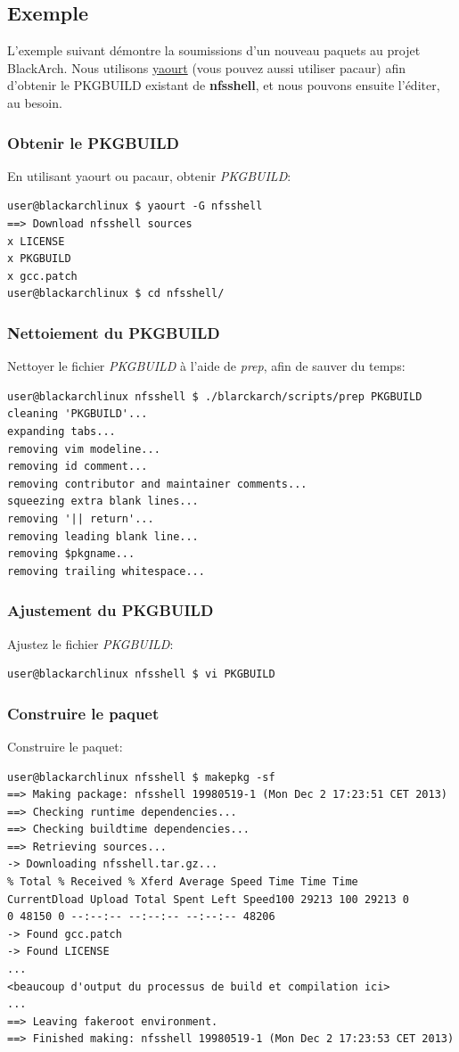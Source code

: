 \documentclass[a4paper, oneside, 11pt]{book}
\begin{document}
\subsection{Exemple}
L'exemple suivant démontre la soumissions d'un nouveau paquets au projet
BlackArch. Nous utilisons \href{https://wiki.archlinux.org/index.php/yaourt}{yaourt}
(vous pouvez aussi utiliser pacaur) afin d'obtenir le PKGBUILD existant de
\textbf{nfsshell}, et nous pouvons ensuite l'éditer, au besoin.

\subsubsection{Obtenir le PKGBUILD}
En utilisant yaourt ou pacaur, obtenir \textit{PKGBUILD}:
{\small
\color{gray}
\begin{verbatim}
user@blackarchlinux $ yaourt -G nfsshell
==> Download nfsshell sources
x LICENSE
x PKGBUILD
x gcc.patch
user@blackarchlinux $ cd nfsshell/
\end{verbatim}
}

\subsubsection{Nettoiement du PKGBUILD}
Nettoyer le fichier \textit{PKGBUILD} à l'aide de \textit{prep}, afin de sauver
du temps:
{\small
\color{gray}
\begin{verbatim}
user@blackarchlinux nfsshell $ ./blarckarch/scripts/prep PKGBUILD
cleaning 'PKGBUILD'...
expanding tabs...
removing vim modeline...
removing id comment...
removing contributor and maintainer comments...
squeezing extra blank lines...
removing '|| return'...
removing leading blank line...
removing $pkgname...
removing trailing whitespace...
\end{verbatim}
}

\subsubsection{Ajustement du PKGBUILD}
Ajustez le fichier \textit{PKGBUILD}:
{\small
\color{gray}
\begin{verbatim}
user@blackarchlinux nfsshell $ vi PKGBUILD
\end{verbatim}
}

\subsubsection{Construire le paquet}
Construire le paquet:
{\small
\color{gray}
\begin{verbatim}
user@blackarchlinux nfsshell $ makepkg -sf
==> Making package: nfsshell 19980519-1 (Mon Dec 2 17:23:51 CET 2013)
==> Checking runtime dependencies...
==> Checking buildtime dependencies...
==> Retrieving sources...
-> Downloading nfsshell.tar.gz...
% Total % Received % Xferd Average Speed Time Time Time
CurrentDload Upload Total Spent Left Speed100 29213 100 29213 0
0 48150 0 --:--:-- --:--:-- --:--:-- 48206
-> Found gcc.patch
-> Found LICENSE
...
<beaucoup d'output du processus de build et compilation ici>
...
==> Leaving fakeroot environment.
==> Finished making: nfsshell 19980519-1 (Mon Dec 2 17:23:53 CET 2013)
\end{verbatim}
}
\end{document}
